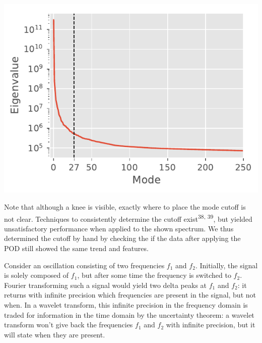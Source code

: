 \documentclass{Dissertate}
\let\origfigure\figure
\let\endorigfigure\endfigure
\renewenvironment{figure}[1][2] {
    \expandafter\origfigure\expandafter[H]
} {
    \endorigfigure
}
\begin{document}
\begin{figure}
\hypertarget{fig:eigen}{%
\centering
\includegraphics{source/figures/pdf/eigenspectrum.pdf}
\caption{Eigenvalue spectrum of the POD of the ManII data. We have placed the cutoff at mode 27.}\label{fig:eigen}
}
\end{figure}

Note that although a knee is visible, exactly where to place the mode cutoff is not clear. Techniques to consistently determine the cutoff exist\textsuperscript{38, 39}, but yielded unsatisfactory performance when applied to the shown spectrum. We thus determined the cutoff by hand by checking the if the data after applying the POD still showed the same trend and features.

 Consider an oscillation consisting of two frequencies $f_1$ and $f_2$. Initially, the signal is solely composed of $f_1$, but after some time the frequency is switched to $f_2$. Fourier transforming such a signal would yield two delta peaks at $f_1$ and $f_2$: it returns with infinite precision which frequencies are present in the signal, but not when. In a wavelet transform, this infinite precision in the frequency domain is traded for information in the time domain by the uncertainty theorem: a wavelet transform won't give back the frequencies $f_1$ and $f_2$ with infinite precision, but it will state when they are present. 
 
\end{document}
